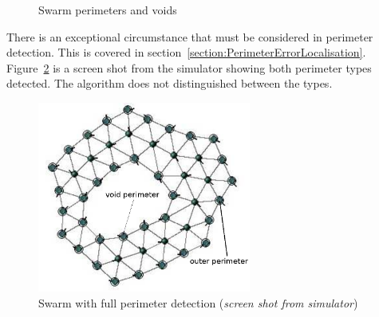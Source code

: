 \begin{figure}[H]
\centering
{}
\caption{Swarm perimeters and voids}
\label{fig:SwarmVoids}
\end{figure}

There is an exceptional circumstance that must be considered in perimeter detection. This is covered in section~\ref{section:PerimeterErrorLocalisation}. Figure~\ref{fig:FullPerimeter1} is a screen shot from the simulator showing both perimeter types detected. The algorithm does not distinguished between the types. 

\begin{figure}[H]
\begin{center}
\includegraphics[width=7cm]{CHAPTER-6/figures/FullPerimeter}
\end{center}
\caption[Swarm with full perimeter detection]{Swarm with full perimeter detection (\textit{screen shot from simulator})\label{fig:FullPerimeter1}}
\end{figure}

